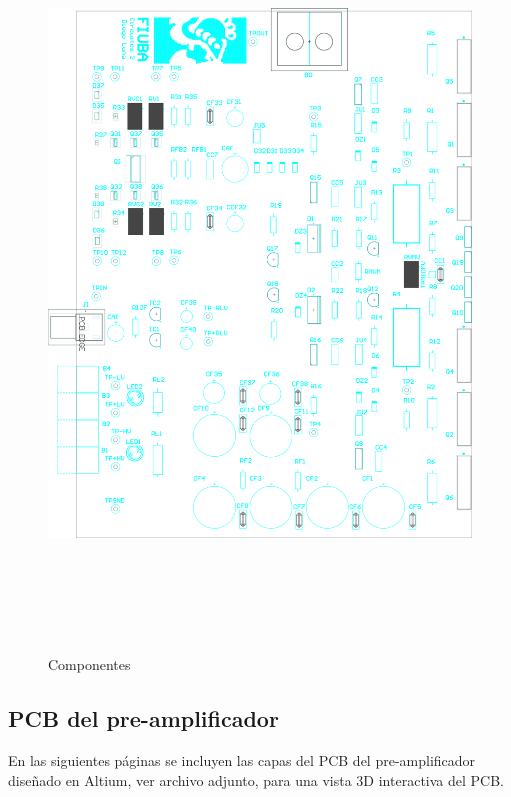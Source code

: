 \begin{figure}[H]
    \centering
    \includegraphics[height=200mm, angle=0]{img/PCB/layers/amplifier/top-overlay.png}
    \caption{\footnotesize{Componentes}}
    \label{fig:pcb_amp_top_overlay}
\end{figure}

\clearpage





\subsection{PCB del pre-amplificador}

En las siguientes páginas se incluyen las capas del PCB del pre-amplificador diseñado en Altium, ver archivo adjunto, \textbf{} para una vista 3D interactiva del PCB.

